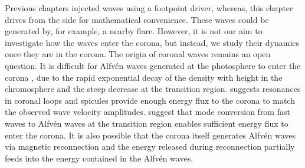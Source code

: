 Previous chapters injected waves using a footpoint driver, whereas, this chapter drives from the side for mathematical convenience.
These waves could be generated by, for example, a nearby flare. However, it is not our aim to investigate how the waves enter the corona, but instead, we study their dynamics once they are in the corona. The origin of coronal waves remains an open question. It is difficult for Alfvén waves generated at the photosphere to enter the corona \citep{Cranmer2005}, due to the rapid exponential decay of the density with height in the chromosphere and the steep decrease at the transition region. \citet{Hollweg1984b} suggests resonances in coronal loops and spicules provide enough energy flux to the corona to match the observed wave velocity amplitudes. \citet{Cally2011,Hansen2012} suggest that mode conversion from fast waves to Alfv\'en waves at the transition region enables sufficient energy flux to enter the corona. It is also possible that the corona itself generates Alfvén waves via magnetic reconnection \citep{Cranmer2018} and the energy released during reconnection partially feeds into the energy contained in the Alfv\'en waves.

